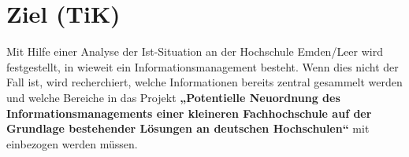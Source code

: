 \section{Ziel (TiK)}
Mit Hilfe einer Analyse der Ist-Situation an der Hochschule Emden/Leer wird festgestellt, in wieweit ein Informationsmanagement besteht. Wenn dies nicht der Fall ist, wird recherchiert, welche Informationen bereits zentral gesammelt werden und welche Bereiche in das Projekt \textbf{„Potentielle Neuordnung des Informationsmanagements einer kleineren Fachhochschule auf der Grundlage bestehender Lösungen an deutschen Hochschulen“} mit einbezogen werden müssen.